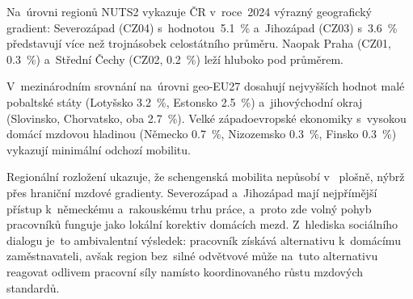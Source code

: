 Na~úrovni regionů \acs{NUTS}2 vykazuje \ac{ČR} v~roce~2024 výrazný geografický gradient: Severozápad (CZ04) s~hodnotou~\SI{5,1}{\percent} a~Jihozápad (CZ03) s~\SI{3,6}{\percent} představují více než trojnásobek celostátního průměru. Naopak Praha (CZ01, \SI{0,3}{\percent}) a~Střední Čechy (CZ02, \SI{0,2}{\percent}) leží hluboko pod průměrem.

V~mezinárodním srovnání na~úrovni \acs{geo-EU27} dosahují nejvyšších hodnot malé pobaltské státy (Lotyšsko \SI{3,2}{\percent}, Estonsko \SI{2,5}{\percent}) a~jihovýchodní okraj  (Slovinsko, Chorvatsko, oba \SI{2,7}{\percent}). Velké západoevropské ekonomiky s~vysokou domácí mzdovou hladinou (Německo \SI{0,7}{\percent}, Nizozemsko \SI{0,3}{\percent}, Finsko \SI{0,3}{\percent}) vykazují minimální odchozí mobilitu.

Regionální rozložení ukazuje, že schengenská mobilita nepůsobí v~ plošně, nýbrž přes hraniční mzdové gradienty. Severozápad a~Jihozápad mají nejpřímější přístup k~německému a~rakouskému trhu práce, a~proto zde volný pohyb pracovníků funguje jako lokální korektiv domácích mezd. Z~hlediska sociálního dialogu je~to ambivalentní výsledek: pracovník získává alternativu k~domácímu zaměstnavateli, avšak region bez~silné odvětvové  může na~tuto alternativu reagovat odlivem pracovní síly namísto koordinovaného růstu mzdových standardů.\cite{narizeni_492_2011}\par


